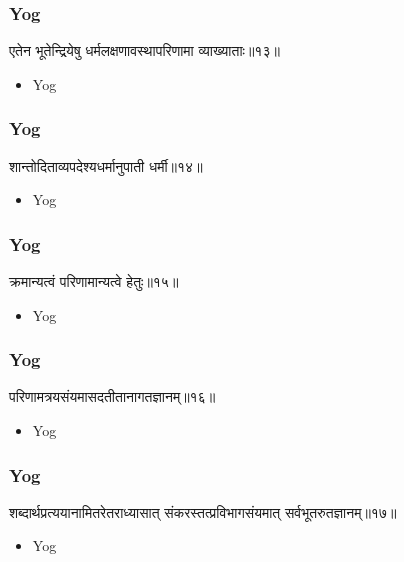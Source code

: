 \begin{frame}[fragile]\frametitle{Yog}
\begin{sanskrit}
एतेन भूतेन्द्रियेषु धर्मलक्षणावस्थापरिणामा व्याख्याताः॥१३॥
\end{sanskrit}
	\begin{itemize}
	\item Yog 
	\end{itemize}
\end{frame}

\begin{frame}[fragile]\frametitle{Yog}
\begin{sanskrit}
शान्तोदिताव्यपदेश्यधर्मानुपाती धर्मी॥१४॥
\end{sanskrit}
	\begin{itemize}
	\item Yog 
	\end{itemize}
\end{frame}

\begin{frame}[fragile]\frametitle{Yog}
\begin{sanskrit}
क्रमान्यत्वं परिणामान्यत्वे हेतुः॥१५॥
\end{sanskrit}
	\begin{itemize}
	\item Yog 
	\end{itemize}
\end{frame}


\begin{frame}[fragile]\frametitle{Yog}
\begin{sanskrit}
परिणामत्रयसंयमासदतीतानागतज्ञानम्॥१६॥
\end{sanskrit}
	\begin{itemize}
	\item Yog 
	\end{itemize}
\end{frame}

\begin{frame}[fragile]\frametitle{Yog}
\begin{sanskrit}
शब्दार्थप्रत्ययानामितरेतराध्यासात् संकरस्तत्प्रविभागसंयमात् सर्वभूतरुतज्ञानम्॥१७॥
\end{sanskrit}
	\begin{itemize}
	\item Yog 
	\end{itemize}
\end{frame}

